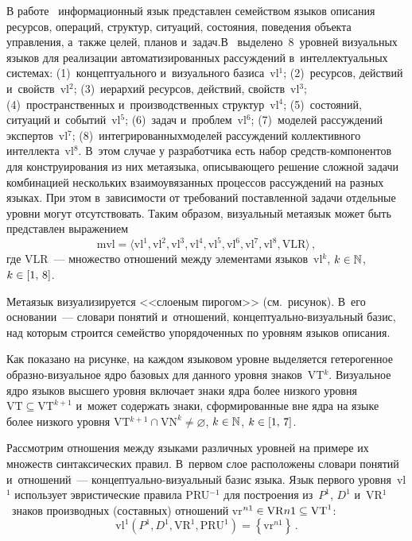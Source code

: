 \begin{multicols}{2}
  В работе~\cite{11-ls} информационный язык пред\-став\-лен семейством языков 
описания ресурсов, операций, структур, ситуаций, состояния, поведения
объекта управления, а~также целей, планов и~задач.\linebreak  В~\cite{12-ls} выделено~8~уровней 
визуальных языков для реализации автоматизированных 
рас\-суж\-де\-ний в~интеллектуальных системах: (1)~концептуального и~визуального 
базиса~vl$^1$; (2)~ресурсов, действий и~свойств~vl$^2$; (3)~иерархий ресурсов, 
действий, свойств~vl$^3$; (4)~пространственных и~производственных 
структур~vl$^4$; (5)~состояний, ситуаций и~событий~vl$^5$; (6)~задач  
и~проб\-лем~vl$^6$; (7)~моделей рассуждений экспертов~vl$^7$; 
(8)~интегрированных\linebreak моделей рассуждений коллективного интеллекта~vl$^8$. 
В~этом случае у разработчика есть набор средств-ком\-по\-нен\-тов для 
конструирования из них метаязыка, описывающего решение сложной задачи 
комбинацией нескольких взаимоувязанных процессов рассуждений на разных 
языках. При этом в~зависимости от требований поставленной задачи отдельные 
уровни могут отсутствовать. Таким образом, визуальный метаязык может быть 
представлен выражением
  \begin{equation}
\mathrm{mvl}=\langle \mathrm{vl}^1, \mathrm{vl}^2, \mathrm{vl}^3, \mathrm{vl}^4, 
\mathrm{vl}^5, \mathrm{vl}^6, \mathrm{vl}^7, \mathrm{vl}^8, \mathrm{VLR}\rangle\,,
  \label{e13-ls}
  \end{equation}
где VLR~--- множество отношений между элементами языков~vl$^k$, 
$k\hm\in \mathbb{N}$, $k\hm\in [1,\,8]$. 
  
  Метаязык визуализируется <<слоеным пирогом>> (см.\ рисунок). В~его 
основании~--- словари понятий и~отношений,  
кон\-цеп\-ту\-аль\-но-ви\-зу\-альн\-ый базис, над которым строится семейство 
упорядоченных по уровням языков описания. 
  


  Как показано на рисунке, на каждом языковом уровне выделяется 
гетерогенное об\-раз\-но-ви\-зу\-аль\-ное ядро базовых для данного уровня 
знаков~VT$^k$. Визуальное ядро языков высшего уровня включает знаки ядра 
более низкого уровня $\mathrm{VT}\subseteq \mathrm{VT}^{k+1}$ и~может содержать знаки, 
сформированные вне ядра на языке более низкого уровня VT$^{k+1}\cap 
\mathrm{VN}^k\not= \varnothing$, $k\hm\in \mathbb{N}$, $k\hm\in [1,\,7]$.
  
  Рассмотрим отношения между языками различных уровней на примере их 
множеств синтаксических правил. В~первом слое расположены словари 
понятий и~отношений~--- кон\-цеп\-ту\-аль\-но-ви\-зу\-аль\-ный базис языка. 
Язык первого уровня~vl$^1$ использует эвристические правила PRU$^{-1}$ 
для построения из~$P^1$, $D^1$ и~VR$^1$~знаков производных (составных) 
отношений vr$^{n1}\hm\in \mathrm{VR}{n1}\subseteq \mathrm{VT}^1$:
  $$
  \mathrm{vl}^1\left(P^1, D^1, \mathrm{VR}^1, \mathrm{PRU}^1\right) = 
  \left\{ \mathrm{vr}^{n1}\right\}\,.
  $$
  

\end{multicols}
